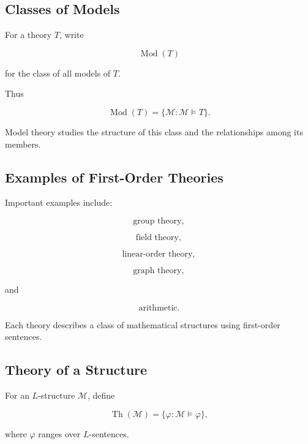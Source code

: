 \subsection{Classes of Models}
\label{subsec:classes-of-models}

For a theory \(T\), write

\[
\boxed{
\operatorname{Mod}(T)
}
\]

for the class of all models of \(T\).

Thus

\[
\boxed{
\operatorname{Mod}(T)
=
\{
\mathcal{M}:
\mathcal{M}\models T
\}.
}
\]

Model theory studies the structure of this class and the relationships
among its members.

\subsection{Examples of First-Order Theories}
\label{subsec:first-order-theory-examples}

Important examples include:

\[
\boxed{
\text{group theory},
}
\]

\[
\boxed{
\text{field theory},
}
\]

\[
\boxed{
\text{linear-order theory},
}
\]

\[
\boxed{
\text{graph theory},
}
\]

and

\[
\boxed{
\text{arithmetic}.
}
\]

Each theory describes a class of mathematical structures using first-order
sentences.

\subsection{Theory of a Structure}
\label{subsec:theory-of-a-structure}

For an \(L\)-structure \(\mathcal{M}\), define

\[
\boxed{
\operatorname{Th}(\mathcal{M})
=
\{
\varphi:
\mathcal{M}\models\varphi
\},
}
\]

where \(\varphi\) ranges over \(L\)-sentences.

